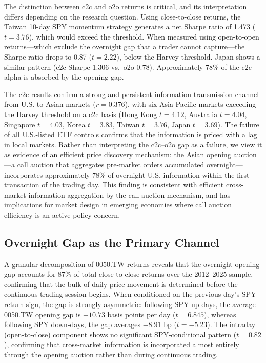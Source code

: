 The distinction between c2c and o2o returns is critical, and its interpretation differs depending on the research question. Using close-to-close returns, the Taiwan 10-day SPY momentum strategy generates a net Sharpe ratio of 1.473 ($t = 3.76$), which would exceed the \citet{harvey2016} threshold. When measured using open-to-open returns---which exclude the overnight gap that a trader cannot capture---the Sharpe ratio drops to 0.87 ($t = 2.22$), below the Harvey threshold. Japan shows a similar pattern (c2c Sharpe 1.306 vs.\ o2o 0.78). Approximately 78\% of the c2c alpha is absorbed by the opening gap.

The c2c results confirm a strong and persistent information transmission channel from U.S. to Asian markets ($r = 0.376$), with six Asia-Pacific markets exceeding the Harvey threshold on a c2c basis (Hong Kong $t = 4.12$, Australia $t = 4.04$, Singapore $t = 4.03$, Korea $t = 3.83$, Taiwan $t = 3.76$, Japan $t = 3.69$). The failure of all U.S.-listed ETF controls confirms that the information is priced with a lag in local markets. Rather than interpreting the c2c--o2o gap as a failure, %
we view it as evidence of an efficient price discovery mechanism: the Asian opening auction---a call auction that aggregates pre-market orders accumulated overnight---incorporates approximately 78\% of overnight U.S. information within the first transaction of the trading day. %
This finding is consistent with efficient cross-market information aggregation by the call auction mechanism, and has implications for market design in emerging economies where call auction efficiency is an active policy concern.

\subsection{Overnight Gap as the Primary Channel}
\label{sec:overnight_gap}

A granular decomposition of 0050.TW returns reveals that the overnight opening gap accounts for 87\% of total close-to-close returns over the 2012--2025 sample, confirming that the bulk of daily price movement is determined before the continuous trading session begins. When conditioned on the previous day's SPY return sign, the gap is strongly asymmetric: following SPY up-days, the average 0050.TW opening gap is $+10.73$ basis points per day ($t = 6.845$), whereas following SPY down-days, the gap averages $-8.91$ bp ($t = -5.23$). The intraday (open-to-close) component shows no significant SPY-conditional pattern ($t = 0.82$), confirming that cross-market information is incorporated almost entirely through the opening auction rather than during continuous trading.

